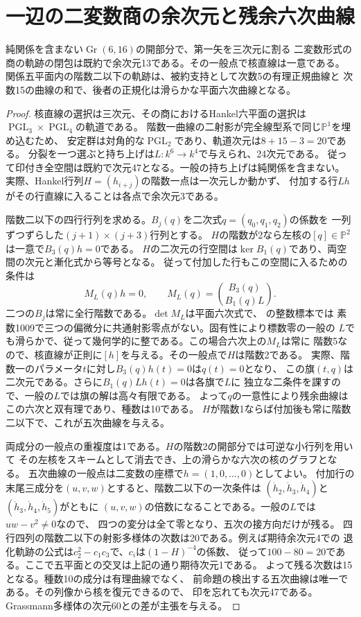 \section{一辺の二変数商の余次元と残余六次曲線}
\label{sec:binary-incidence-sextic}
\begin{theorem}\label{thm:binary-incidence-codimension}
純関係を含まない$\operatorname{Gr}(6,16)$の開部分で、第一矢を三次元に割る
二変数形式の商の軌跡の閉包は既約で余次元13である。その一般点で核直線は一意である。
関係五平面内の階数二以下の軌跡は、被約支持として次数5の有理正規曲線と
次数15の曲線の和で、後者の正規化は滑らかな平面六次曲線となる。
\end{theorem}
\begin{proof}
核直線の選択は三次元、その商におけるHankel六平面の選択は
$\operatorname{PGL}_3\times\operatorname{PGL}_4$の軌道である。
階数一曲線の二射影が完全線型系で同じ$\mathbb P^1$を埋め込むため、
安定群は対角的な$\operatorname{PGL}_2$であり、軌道次元は$8+15-3=20$である。
分裂を一つ選ぶと持ち上げは$L:k^6\to k^4$で与えられ、24次元である。
従って印付き全空間は既約で次元47となる。一般の持ち上げは純関係を含まない。
実際、Hankel行列$H=(h_{i+j})$の階数一点は一次元しか動かず、
付加する行$Lh$がその行直線に入ることは各点で余次元3である。

階数二以下の四行行列を求める。$B_j(q)$を二次式$q=(q_0,q_1,q_2)$の係数を
一列ずつずらした$(j+1)\times(j+3)$行列とする。
$H$の階数が2なら左核の$[q]\in\mathbb P^2$は一意で$B_3(q)h=0$である。
$H$の二次元の行空間は$\ker B_1(q)$であり、両空間の次元と漸化式から等号となる。
従って付加した行もこの空間に入るための条件は
\[
 M_L(q)h=0,\qquad M_L(q)=\binom{B_3(q)}{B_1(q)L}.
\]
二つの$B_j$は常に全行階数である。$\det M_L$は平面六次式で、
の整数標本では
素数1009で三つの偏微分に共通射影零点がない。固有性により標数零の一般の
$L$でも滑らかで、従って幾何学的に整である。この場合六次上の$M_L$は常に
階数5なので、核直線が正則に$[h]$を与える。その一般点で$H$は階数2である。
実際、階数一のパラメータ$t$に対し$B_3(q)h(t)=0$は$q(t)=0$となり、
この旗$(t,q)$は二次元である。さらに$B_1(q)Lh(t)=0$は各旗で$L$に
独立な二条件を課すので、一般の$L$では旗の解は高々有限である。
よって$q$の一意性により残余曲線はこの六次と双有理であり、種数は10である。
$H$が階数1ならば付加後も常に階数二以下で、これが五次曲線を与える。

両成分の一般点の重複度は1である。$H$の階数2の開部分では可逆な小行列を用いて
その左核をスキームとして消去でき、上の滑らかな六次の核のグラフとなる。
五次曲線の一般点は二変数の座標で$h=(1,0,\ldots,0)$としてよい。
付加行の末尾三成分を$(u,v,w)$とすると、階数二以下の一次条件は
$(\dot h_2,\dot h_3,\dot h_4)$と$(\dot h_3,\dot h_4,\dot h_5)$がともに
$(u,v,w)$の倍数になることである。一般の$L$では$uw-v^2\ne0$なので、
四つの変分は全て零となり、五次の接方向だけが残る。
四行四列の階数二以下の射影多様体の次数は20である。例えば期待余次元4での
退化軌跡の公式は$ c_2^2-c_1c_3$で、$c_i$は$(1-H)^{-4}$の係数、
従って$100-80=20$である。ここで五平面との交叉は上記の通り期待次元1である。
よって残る次数は15となる。種数10の成分は有理曲線でなく、
前命題の検出する五次曲線は唯一である。その列像から核を復元できるので、
印を忘れても次元47である。Grassmann多様体の次元60との差が主張を与える。
\end{proof}
